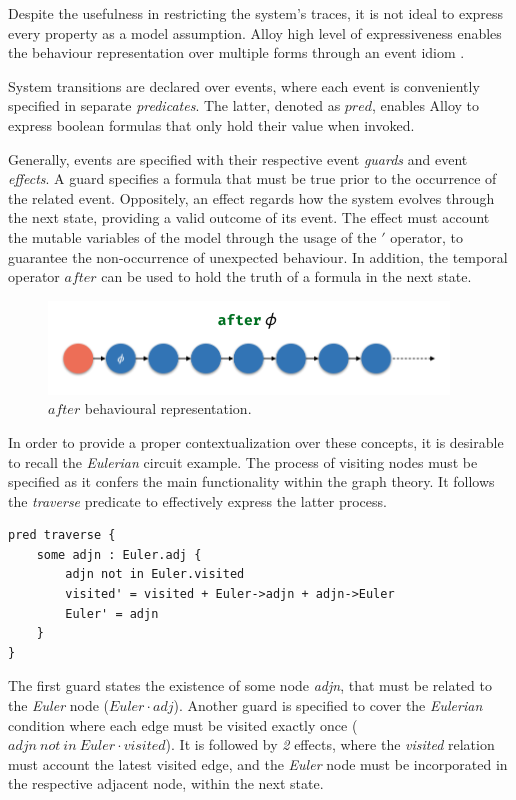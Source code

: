 Despite the usefulness in restricting the system's traces, it is not ideal to express every property as a model assumption. Alloy high level of expressiveness enables the behaviour representation over multiple forms through an event idiom \cite{lwspecification}.

System transitions are declared over events, where each event is conveniently specified in separate \textit{predicates}. The latter, denoted as $pred$, enables Alloy to express boolean formulas that only hold their value when invoked. 

Generally, events are specified with their respective event \textit{guards} and event \textit{effects}. A guard specifies a formula that must be true prior to the occurrence of the related event. Oppositely, an effect regards how the system evolves through the next state, providing a valid outcome of its event. The effect must account the mutable variables of the model through the usage of the $'$ operator, to guarantee the non-occurrence of unexpected behaviour. In addition, the temporal operator $after$ can be used to hold the truth of a formula in the next state.

\begin{figure}[H]
    \centering
    \includegraphics[width=0.6\linewidth]{images/alloy_after.png}
    \caption{$after$ behavioural representation.}
    \label{fig:alloy-after}
\end{figure}

In order to provide a proper contextualization over these concepts, it is desirable to recall the \textit{Eulerian} circuit example. The process of visiting nodes must be specified as it confers the main functionality within the graph theory. It follows the \textit{traverse} predicate to effectively express the latter process. 

\begin{lstlisting}[title={\textit{Eulerian} visiting event.}, otherkeywords = {pred, some, \:, \., not, in, ', \=, \+, \-\>}, floatplacement=H]
pred traverse {
    some adjn : Euler.adj {
        adjn not in Euler.visited
        visited' = visited + Euler->adjn + adjn->Euler
        Euler' = adjn
    }
}
\end{lstlisting}

The first guard states the existence of some node \textit{adjn}, that must be related to the \textit{Euler} node ($Euler \cdot adj$). Another guard is specified to cover the \textit{Eulerian} condition where each edge must be visited exactly once ($adjn\ not\ in\ Euler \cdot visited$). It is followed by \textit{2} effects, where the \textit{visited} relation must account the latest visited edge, and the \textit{Euler} node must be incorporated in the respective adjacent node, within the next state.

